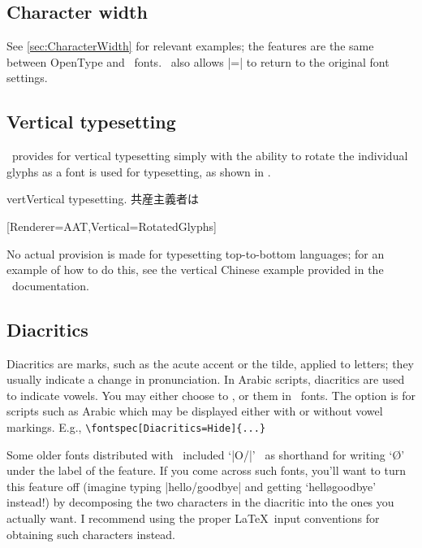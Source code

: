 \subsection{Character width}
See \vref{sec:CharacterWidth} for relevant examples; the features are
the same between OpenType and \AAT\ fonts.
\AAT\ also allows |=| to return to
the original font settings.







\subsection{Vertical typesetting}

\XeTeX\ provides for vertical typesetting simply with the ability to rotate
the individual glyphs as a font is used for typesetting, as shown in
.

\begin{Xexample}[firstline=2]{vert}{Vertical typesetting.}
  \def\verttext{共産主義者は}
  \verttext

  [Renderer=AAT,Vertical=RotatedGlyphs]
  \rotatebox{-90}{\verttext}%
\end{Xexample}

No actual provision is made for typesetting top-to-bottom
languages; for an example of how to do this, see the vertical Chinese
example provided in the \XeTeX\ documentation.




\subsection{Diacritics}
Diacritics are marks, such as the acute accent or the tilde, applied to letters; they usually indicate a change in pronunciation.
In Arabic scripts, diacritics are used to indicate vowels.
You may either choose
to ,  or  them in \AAT\ fonts.
The  option is for scripts such as Arabic which may be
displayed either with or without vowel markings. E.g.,
\verb|\fontspec[Diacritics=Hide]{...}|

Some older fonts distributed with \MacOSX\ included `|O/|' \etc\ as shorthand for writing `\O' under the label of the  feature. If you come across such fonts, you'll
want to turn this feature off (imagine typing |hello/goodbye| and
getting `hell\o goodbye' instead!) by decomposing the two characters
in the diacritic into the ones you actually
want. I recommend using
the proper \LaTeX\ input conventions for obtaining such characters
instead.



